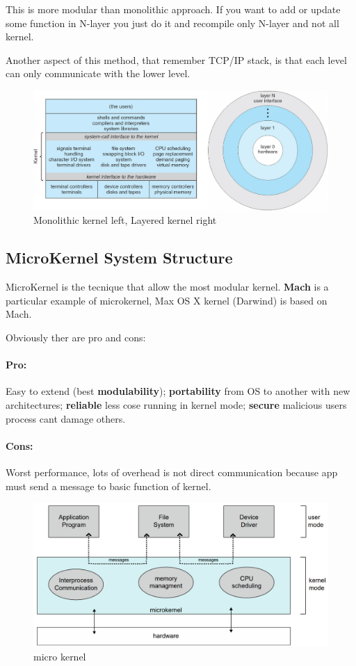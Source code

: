 This is more modular than monolithic approach. If you want to add or update some function in N-layer you just do it and recompile only N-layer and not all kernel.

Another aspect of this method, that remember TCP/IP stack, is that each level can only communicate with the lower level. 

\begin{figure}[htbp]
    \centering
    \includegraphics[width=0.85\linewidth]{img/kernel_mono_layer.png}
    \caption{Monolithic kernel left, Layered kernel right}
    
\end{figure}


\newpage
\subsection{MicroKernel System Structure}
MicroKernel is the tecnique that allow the most modular kernel. \textbf{Mach} is a particular example of microkernel, Max OS X kernel (Darwind) is based on Mach.

Obviously ther are pro and cons:
\paragraph{Pro:}
Easy to extend (best \textbf{modulability}); \textbf{portability} from OS to another with new architectures; \textbf{reliable} less cose running in kernel mode; \textbf{secure} malicious users process cant damage others.


\paragraph{Cons:}
Worst performance, lots of overhead is not direct communication because app must send a message to basic function of kernel.

\begin{figure}[htbp]
    \centering
    \includegraphics[width=0.6\linewidth]{img/microKer.png}
    \caption{micro kernel}
\end{figure}

